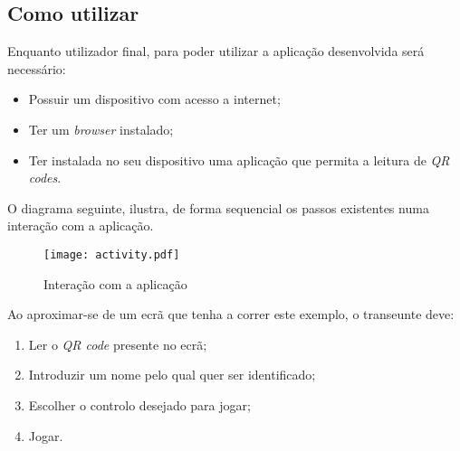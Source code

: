 	\subsection{Como utilizar}

	Enquanto utilizador final, para poder utilizar a aplicação desenvolvida será necessário:
	\begin{itemize}
		\item Possuir um dispositivo com acesso a internet;
		\item Ter um \textit{browser} instalado;
		\item Ter instalada no seu dispositivo uma aplicação que permita a leitura de \textit{QR codes}.
	\end{itemize}

	O diagrama seguinte, ilustra, de forma sequencial os passos existentes numa interação com a aplicação.
	\newline

	\begin{figure}[ht]
	\centering
	\texttt{[image: activity.pdf]}
	\caption[Utilização]{Interação com a aplicação}
	\label{fig:interagir}
	\end{figure}

	Ao aproximar-se de um ecrã que tenha a correr este exemplo, o transeunte deve:

	\begin{enumerate}
		\item Ler o \textit{QR code} presente no ecrã;
		\item Introduzir um nome pelo qual quer ser identificado;
		\item Escolher o controlo desejado para jogar;
		\item Jogar.
	\end{enumerate}


	


	





